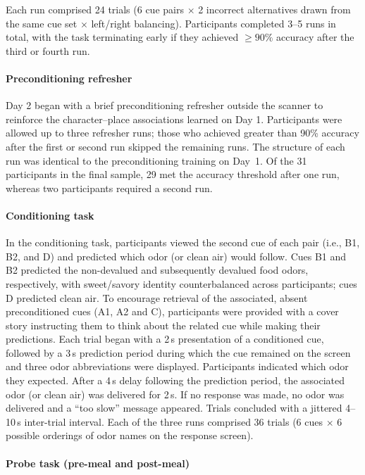 \documentclass[12pt,letterpaper]{article}
\begin{document}
Each run comprised 24 trials (6 cue pairs $\times$ 2 incorrect alternatives drawn from the same cue set $\times$ left/right balancing). Participants completed 3--5 runs in total, with the task terminating early if they achieved $\geq 90\%$ accuracy after the third or fourth run.

\paragraph*{Preconditioning refresher}

Day 2 began with a brief preconditioning refresher outside the scanner to reinforce the character–place associations learned on Day 1. Participants were allowed up to three refresher runs; those who achieved greater than 90\% accuracy after the first or second run skipped the remaining runs. The structure of each run was identical to the preconditioning training on Day~1. Of the 31 participants in the final sample, 29 met the accuracy threshold after one run, whereas two participants required a second run.

\paragraph*{Conditioning task}

In the conditioning task, participants viewed the second cue of each pair (i.e., B1, B2, and D) and predicted which odor (or clean air) would follow. Cues B1 and B2 predicted the non-devalued and subsequently devalued food odors, respectively, with sweet/savory identity counterbalanced across participants; cues D predicted clean air. To encourage retrieval of the associated, absent preconditioned cues (A1, A2 and C), participants were provided with a cover story instructing them to think about the related cue while making their predictions. Each trial began with a 2\,s presentation of a conditioned cue, followed by a 3\,s prediction period during which the cue remained on the screen and three odor abbreviations were displayed. Participants indicated which odor they expected. After a 4\,s delay following the prediction period, the associated odor (or clean air) was delivered for 2\,s. If no response was made, no odor was delivered and a “too slow” message appeared. Trials concluded with a jittered 4--10\,s inter-trial interval. Each of the three runs comprised 36 trials (6 cues $\times$ 6 possible orderings of odor names on the response screen).

\paragraph*{Probe task (pre-meal and post-meal)}
\end{document}
